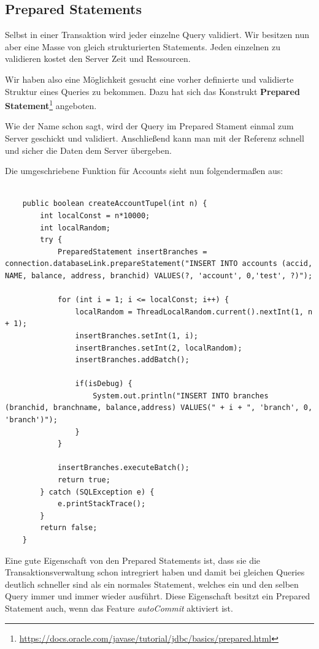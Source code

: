 \subsection{Prepared Statements}
Selbst in einer Transaktion wird jeder einzelne Query validiert. Wir besitzen
nun aber eine Masse von gleich strukturierten Statements. Jeden einzelnen zu
validieren kostet den Server Zeit und Ressourcen.
 
Wir haben also eine Möglichkeit gesucht eine vorher definierte und validierte
Struktur eines Queries zu bekommen. Dazu hat sich das Konstrukt 
\textbf{Prepared Statement}\footnote{\url{https://docs.oracle.com/javase/tutorial/jdbc/basics/prepared.html}} angeboten.
 
Wie der Name schon sagt, wird der Query im Prepared Stament einmal zum Server
geschickt und validiert. Anschließend kann man mit der Referenz
schnell und sicher die Daten dem Server übergeben.
 
Die umgeschriebene Funktion für Accounts sieht nun folgendermaßen aus:
 \begin{lstlisting}

	public boolean createAccountTupel(int n) {
		int localConst = n*10000;
		int localRandom;		
		try {
			PreparedStatement insertBranches = connection.databaseLink.prepareStatement("INSERT INTO accounts (accid, NAME, balance, address, branchid) VALUES(?, 'account', 0,'test', ?)");
			
			for (int i = 1; i <= localConst; i++) {
				localRandom = ThreadLocalRandom.current().nextInt(1, n + 1);
				insertBranches.setInt(1, i);
				insertBranches.setInt(2, localRandom);
				insertBranches.addBatch();
				
				if(isDebug) {
					System.out.println("INSERT INTO branches (branchid, branchname, balance,address) VALUES(" + i + ", 'branch', 0, 'branch')");
				}
			}

			insertBranches.executeBatch();
			return true;
		} catch (SQLException e) {
			e.printStackTrace();
		}
		return false;
	}
 \end{lstlisting}

Eine gute Eigenschaft von den Prepared Statements ist, dass sie die
Transaktionsverwaltung schon intregriert haben und damit bei gleichen Queries
deutlich schneller sind als ein normales Statement, welches ein und den selben
Query immer und immer wieder ausführt. Diese Eigenschaft besitzt ein
Prepared Statement auch, wenn das Feature \textit{autoCommit} aktiviert ist.

